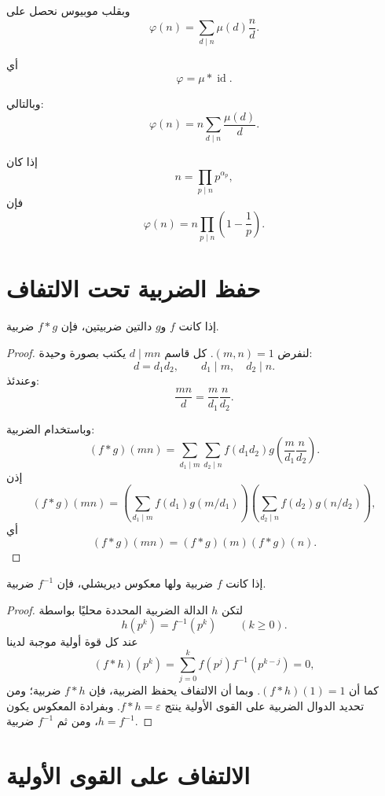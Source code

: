 وبقلب موبيوس نحصل على
\[
\varphi(n)
=
\sum_{d\mid n}\mu(d)\frac{n}{d}.
\]

أي
\[
\varphi
=
\mu*\operatorname{id}.
\]

وبالتالي:
\[
\varphi(n)
=
n\sum_{d\mid n}\frac{\mu(d)}{d}.
\]

إذا كان
\[
n=\prod_{p\mid n}p^{\alpha_p},
\]
فإن
\[
\varphi(n)
=
n\prod_{p\mid n}\left(1-\frac1p\right).
\]

\section{حفظ الضربية تحت الالتفاف}

\begin{theorem}
\label{thm:convolution-preserves-multiplicativity}
\provedhere
إذا كانت \(f\) و\(g\) دالتين ضربيتين، فإن \(f*g\) ضربية.
\end{theorem}

\begin{proof}
لنفرض \((m,n)=1\). كل قاسم \(d\mid mn\) يكتب بصورة وحيدة:
\[
d=d_1d_2,
\qquad
d_1\mid m,
\quad
d_2\mid n.
\]
وعندئذ:
\[
\frac{mn}{d}
=
\frac{m}{d_1}\frac{n}{d_2}.
\]

وباستخدام الضربية:
\[
(f*g)(mn)
=
\sum_{d_1\mid m}
\sum_{d_2\mid n}
f(d_1d_2)
g\left(\frac{m}{d_1}\frac{n}{d_2}\right).
\]
إذن
\[
(f*g)(mn)
=
\left(\sum_{d_1\mid m}
f(d_1)g(m/d_1)\right)
\left(\sum_{d_2\mid n}
f(d_2)g(n/d_2)\right),
\]
أي
\[
(f*g)(mn)
=
(f*g)(m)(f*g)(n).
\]
\end{proof}

\begin{corollary}
\label{cor:dirichlet-inverse-multiplicative}
\provedhere
إذا كانت \(f\) ضربية ولها معكوس ديريشلي، فإن \(f^{-1}\) ضربية.
\end{corollary}

\begin{proof}
لتكن \(h\) الدالة الضربية المحددة محليًا بواسطة
\[
h(p^k)=f^{-1}(p^k)
\qquad(k\geq0).
\]
عند كل قوة أولية موجبة لدينا
\[
(f*h)(p^k)
=
\sum_{j=0}^{k}f(p^j)f^{-1}(p^{k-j})
=0,
\]
كما أن \((f*h)(1)=1\). وبما أن الالتفاف يحفظ الضربية، فإن \(f*h\)
ضربية؛ ومن تحديد الدوال الضربية على القوى الأولية ينتج
\(f*h=\varepsilon\). وبفرادة المعكوس يكون \(h=f^{-1}\)، ومن ثم
\(f^{-1}\) ضربية.
\end{proof}

\section{الالتفاف على القوى الأولية}

